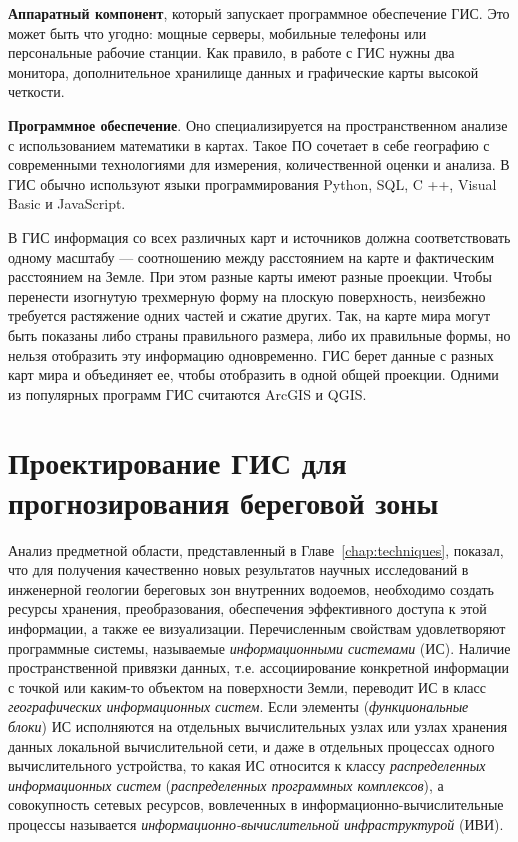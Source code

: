 \documentclass[732,fontsize=14pt,final]{studrep}
\begin{document}
\textbf{Аппаратный компонент}, который запускает программное обеспечение ГИС. Это может быть что угодно: мощные серверы, мобильные телефоны или персональные рабочие станции. Как правило, в работе с ГИС нужны два монитора, дополнительное хранилище данных и графические карты высокой четкости.

\textbf{Программное обеспечение}. Оно специализируется на пространственном анализе с использованием математики в картах. Такое ПО сочетает в себе географию с современными технологиями для измерения, количественной оценки и анализа. В ГИС обычно используют языки программирования Python, SQL, C ++, Visual Basic и JavaScript.

В ГИС информация со всех различных карт и источников должна соответствовать одному масштабу — соотношению между расстоянием на карте и фактическим расстоянием на Земле. При этом разные карты имеют разные проекции. Чтобы перенести изогнутую трехмерную форму на плоскую поверхность, неизбежно требуется растяжение одних частей и сжатие других. Так, на карте мира могут быть показаны либо страны правильного размера, либо их правильные формы, но нельзя отобразить эту информацию одновременно. ГИС берет данные с разных карт мира и объединяет ее, чтобы отобразить в одной общей проекции. Одними из популярных программ ГИС считаются ArcGIS и QGIS.

\chapter{Проектирование ГИС для прогнозирования береговой зоны}\label{chap:proj}

Анализ предметной области, представленный в Главе~\ref{chap:techniques}, показал, что для получения качественно новых результатов научных исследований в инженерной геологии береговых зон внутренних водоемов, необходимо создать ресурсы хранения, преобразования, обеспечения эффективного доступа к этой информации, а также ее визуализации. Перечисленным свойствам удовлетворяют программные системы, называемые \emph{информационными системами} (ИС). Наличие пространственной привязки данных, т.е. ассоциирование конкретной информации с точкой или каким-то объектом на поверхности Земли, переводит ИС в класс \emph{географических информационных систем}. Если элементы (\emph{функциональные блоки}) ИС исполняются на отдельных вычислительных узлах или узлах хранения данных локальной вычислительной сети, и даже в отдельных процессах одного вычислительного устройства, то какая ИС относится к классу \emph{распределенных информационных систем} (\emph{распределенных программных комплексов}), а совокупность сетевых ресурсов, вовлеченных в информационно-вычислительные процессы называется \emph{информационно-вычислительной инфраструктурой} (ИВИ).
\end{document}
